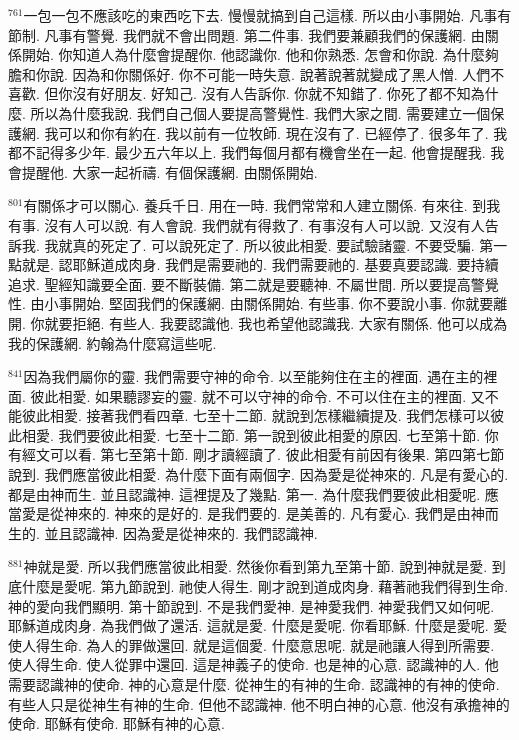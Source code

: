 \documentclass{book}
\begin{document}
$^{761}$一包一包不應該吃的東西吃下去.
慢慢就搞到自己這樣.
所以由小事開始.
凡事有節制.
凡事有警覺.
我們就不會出問題.
第二件事.
我們要兼顧我們的保護網.
由關係開始.
你知道人為什麼會提醒你.
他認識你.
他和你熟悉.
怎會和你說.
為什麼夠膽和你說.
因為和你關係好.
你不可能一時失意.
說著說著就變成了黑人憎.
人們不喜歡.
但你沒有好朋友.
好知己.
沒有人告訴你.
你就不知錯了.
你死了都不知為什麼.
所以為什麼我說.
我們自己個人要提高警覺性.
我們大家之間.
需要建立一個保護網.
我可以和你有約在.
我以前有一位牧師.
現在沒有了.
已經停了.
很多年了.
我都不記得多少年.
最少五六年以上.
我們每個月都有機會坐在一起.
他會提醒我.
我會提醒他.
大家一起祈禱.
有個保護網.
由關係開始.

$^{801}$有關係才可以關心.
養兵千日.
用在一時.
我們常常和人建立關係.
有來往.
到我有事.
沒有人可以說.
有人會說.
我們就有得救了.
有事沒有人可以說.
又沒有人告訴我.
我就真的死定了.
可以說死定了.
所以彼此相愛.
要試驗諸靈.
不要受騙.
第一點就是.
認耶穌道成肉身.
我們是需要祂的.
我們需要祂的.
基要真要認識.
要持續追求.
聖經知識要全面.
要不斷裝備.
第二就是要聽神.
不屬世間.
所以要提高警覺性.
由小事開始.
堅固我們的保護網.
由關係開始.
有些事.
你不要說小事.
你就要離開.
你就要拒絕.
有些人.
我要認識他.
我也希望他認識我.
大家有關係.
他可以成為我的保護網.
約翰為什麼寫這些呢.

$^{841}$因為我們屬你的靈.
我們需要守神的命令.
以至能夠住在主的裡面.
遇在主的裡面.
彼此相愛.
如果聽謬妄的靈.
就不可以守神的命令.
不可以住在主的裡面.
又不能彼此相愛.
接著我們看四章.
七至十二節.
就說到怎樣繼續提及.
我們怎樣可以彼此相愛.
我們要彼此相愛.
七至十二節.
第一說到彼此相愛的原因.
七至第十節.
你有經文可以看.
第七至第十節.
剛才讀經讀了.
彼此相愛有前因有後果.
第四第七節說到.
我們應當彼此相愛.
為什麼下面有兩個字.
因為愛是從神來的.
凡是有愛心的.
都是由神而生.
並且認識神.
這裡提及了幾點.
第一.
為什麼我們要彼此相愛呢.
應當愛是從神來的.
神來的是好的.
是我們要的.
是美善的.
凡有愛心.
我們是由神而生的.
並且認識神.
因為愛是從神來的.
我們認識神.

$^{881}$神就是愛.
所以我們應當彼此相愛.
然後你看到第九至第十節.
說到神就是愛.
到底什麼是愛呢.
第九節說到.
祂使人得生.
剛才說到道成肉身.
藉著祂我們得到生命.
神的愛向我們顯明.
第十節說到.
不是我們愛神.
是神愛我們.
神愛我們又如何呢.
耶穌道成肉身.
為我們做了還活.
這就是愛.
什麼是愛呢.
你看耶穌.
什麼是愛呢.
愛使人得生命.
為人的罪做還回.
就是這個愛.
什麼意思呢.
就是祂讓人得到所需要.
使人得生命.
使人從罪中還回.
這是神義子的使命.
也是神的心意.
認識神的人.
他需要認識神的使命.
神的心意是什麼.
從神生的有神的生命.
認識神的有神的使命.
有些人只是從神生有神的生命.
但他不認識神.
他不明白神的心意.
他沒有承擔神的使命.
耶穌有使命.
耶穌有神的心意.
\end{document}
